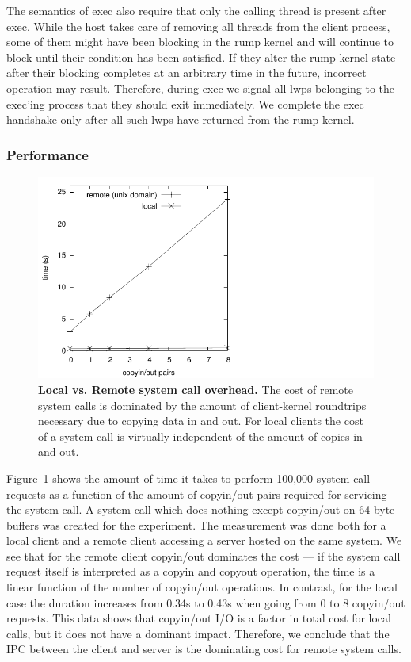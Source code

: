 The semantics of exec also require that only the calling thread is
present after exec.  While the host takes care of removing all
threads from the client process, some of them might have been
blocking in the rump kernel and will continue to block until their
condition has been satisfied.  If they alter the rump kernel state
after their blocking completes at an arbitrary time in the future,
incorrect operation may result.  Therefore, during exec we signal
all lwps belonging to the exec'ing process that they should exit
immediately.  We complete the exec handshake only after all
such lwps have returned from the rump kernel.


\subsubsection{Performance}

\begin{figure}[t]
\includegraphics{remsys.pdf}
\caption[Local vs. Remote system call overhead]{
\textbf{Local vs. Remote system call overhead.}
The cost of remote system calls is dominated by the amount of
client-kernel roundtrips necessary due to copying data in and
out.  For local clients the cost of a system call is virtually independent
of the amount of copies in and out.
}
\label{fig:remsys}
\end{figure}

Figure~\ref{fig:remsys} shows the amount of time it takes to
perform 100,000 system call requests as a function of the amount
of copyin/out pairs required for servicing the system call.  A
system call which does nothing except
copyin/out on 64 byte buffers was created for the experiment.  The measurement was done both
for a local client and a remote client accessing a server hosted
on the same system.  We see that for the remote client copyin/out
dominates the cost --- if the system call request itself is
interpreted as a copyin and copyout operation, the time is a linear
function of the number of copyin/out operations.  In contrast, for
the local case the duration increases from 0.34s to 0.43s when going
from 0 to 8 copyin/out requests.  This data
shows that copyin/out I/O is a factor in total cost for local calls,
but it does not have a dominant impact.  Therefore, we conclude that
the IPC between the client and server is the dominating cost for remote
system calls.

